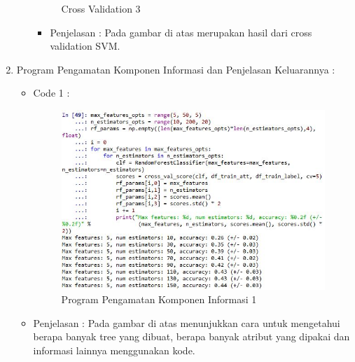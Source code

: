 \begin{enumerate}
\begin{itemize}
\begin{figure}[ht]
\caption{Cross Validation 3}
\label{contoh}
\end{figure}
\par
\begin{itemize}
\item Penjelasan : Pada gambar di atas merupakan hasil dari cross validation SVM.
\par
\par
\end{itemize}
\end{itemize}
\par
\par
\item Program Pengamatan Komponen Informasi dan Penjelasan Keluarannya :
\begin{itemize}
\item Code 1 :
\par
\begin{figure}[ht]
\centering
\includegraphics[scale=0.7]{figures/pd29.jpg}
\caption{Program Pengamatan Komponen Informasi 1}
\label{contoh}
\end{figure}
\end{itemize}
\par
\begin{itemize}
\item Penjelasan : Pada gambar di atas menunjukkan cara untuk mengetahui berapa banyak tree yang dibuat, berapa banyak atribut yang dipakai dan informasi lainnya menggunakan kode.
\par 
\par



\end{itemize}
\end{enumerate}
